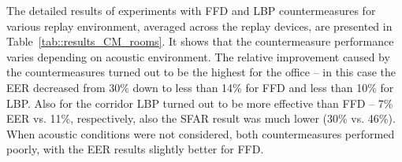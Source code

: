 
The detailed results of experiments with FFD and LBP countermeasures for various replay environment, averaged across the replay devices, are presented in Table~\ref{tab::results_CM_rooms}. It shows that the countermeasure performance varies depending on acoustic environment. The relative improvement caused by the countermeasures turned out to be the highest for the office -- in this case the EER decreased from 30\% down to less than 14\% for FFD and less than 10\% for LBP. Also for the corridor LBP turned out to be more effective than FFD -- 7\% EER vs. 11\%, respectively, also the SFAR result was much lower (30\% vs. 46\%). When acoustic conditions were not considered, both countermeasures performed poorly, with the EER results slightly better for FFD. 




